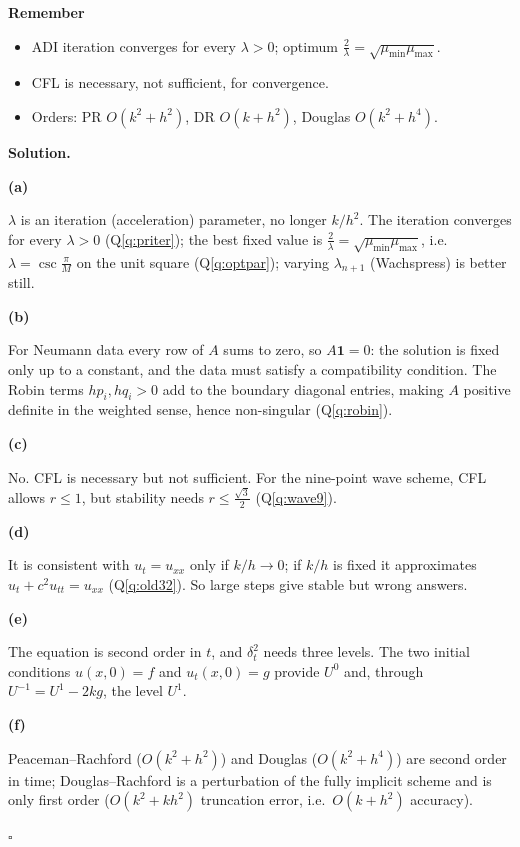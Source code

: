 \documentclass[11pt,a4paper]{article}
\newenvironment{rem}
  {\begin{remember}\noindent\textbf{Remember}\par\nobreak\vspace{-0.3em}}
  {\end{remember}}
\newenvironment{solution}
  {\par\noindent\textbf{Solution.}\par\nobreak}
  {\par\nobreak\noindent\hfill\(\square\)\par}
\newcommand{\step}[1]{\par\addvspace{0.5em}\noindent\textbf{#1}\par\nobreak}
\newcommand{\lam}{\lambda_{n+1}}
\begin{document}
\begin{rem}
\begin{itemize}
  \item ADI iteration converges for every \(\lambda>0\); optimum
    \(\frac2\lambda=\sqrt{\mu_{\min}\mu_{\max}}\).
  \item CFL is necessary, not sufficient, for convergence.
  \item Orders: PR \(O(k^2+h^2)\), DR \(O(k+h^2)\), Douglas
    \(O(k^2+h^4)\).
\end{itemize}
\end{rem}

\begin{solution}
\step{(a)}
\(\lambda\) is an iteration (acceleration) parameter, no longer
\(k/h^2\).  The iteration converges for every \(\lambda>0\)
(Q\ref{q:priter}); the best fixed value is
\(\frac2\lambda=\sqrt{\mu_{\min}\mu_{\max}}\), i.e.\ \(\lambda=\csc\frac\pi M\) on
the unit square (Q\ref{q:optpar}); varying \(\lam\) (Wachspress) is
better still.

\step{(b)}
For Neumann data every row of \(A\) sums to zero, so \(A\mathbf1=0\):
the solution is fixed only up to a constant, and the data must satisfy
a compatibility condition.  The Robin terms \(hp_i,hq_i>0\) add to the
boundary diagonal entries, making \(A\) positive definite in the
weighted sense, hence non-singular (Q\ref{q:robin}).

\step{(c)}
No.  CFL is necessary but not sufficient.  For the nine-point wave
scheme, CFL allows \(r\le1\), but stability needs \(r\le\frac{\sqrt3}2\)
(Q\ref{q:wave9}).

\step{(d)}
It is consistent with \(u_t=u_{xx}\) only if \(k/h\to0\); if \(k/h\) is
fixed it approximates \(u_t+c^2u_{tt}=u_{xx}\) (Q\ref{q:old32}).  So
large steps give stable but wrong answers.

\step{(e)}
The equation is second order in \(t\), and \(\delta_t^2\) needs three
levels.  The two initial conditions \(u(x,0)=f\) and \(u_t(x,0)=g\)
provide \(U^0\) and, through \(U^{-1}=U^1-2kg\), the level \(U^1\).

\step{(f)}
Peaceman--Rachford (\(O(k^2+h^2)\)) and Douglas (\(O(k^2+h^4)\)) are
second order in time; Douglas--Rachford is a perturbation of the fully
implicit scheme and is only first order (\(O(k^2+kh^2)\) truncation
error, i.e.\ \(O(k+h^2)\) accuracy).
\end{solution}
\end{document}
